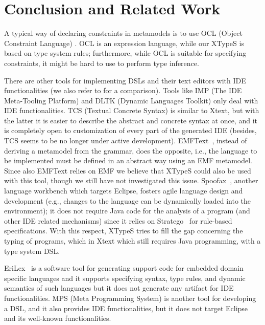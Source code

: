 \section{Conclusion and Related Work}
\label{sec:conclusion}

\newcommand{\xtypes}{XTypeS}
\newcommand{\xtext}{Xtext}

A typical way of declaring constraints in metamodels is to use OCL (Object
Constraint Language) \cite{WarmerKleppe99,OCLOMG}.  OCL is an expression
language, while our \xtypes{} is based on type system rules; furthermore, while
OCL is suitable for specifying constraints, it might be hard to use to perform
type inference.

There are other tools for implementing DSLs and their text editors with IDE
functionalities (we also refer to \cite{PP08} for a comparison). Tools like IMP
(The IDE Meta-Tooling Platform) \cite{imp09} and DLTK (Dynamic Languages
Toolkit) \cite{DLTK} only deal with IDE functionalities. TCS (Textual Concrete
Syntax) \cite{tcs} is similar to \xtext, but with the latter it is easier to
describe the abstract and concrete syntax at once, and it is completely open to
customization of every part of the generated IDE (besides, TCS seems to be no
longer under active development). EMFText~\cite{emftext09}, instead of deriving
a metamodel from the grammar, does the opposite, i.e., the language to be
implemented must be defined in an abstract way using an EMF metamodel. Since
also EMFText relies on EMF we believe that \xtypes{} could also be used with
this tool, though we still have not investigated this issue.
Spoofax~\cite{Spoofax2010}, another language workbench which targets Eclipse,
fosters agile language design and development (e.g., changes to the language can
be dynamically loaded into the environment); it does not require Java code for
the analysis of a program (and other IDE related mechanisms) since it relies on
Stratego~\cite{Stratego2008} for rule-based specifications.  With this respect,
\xtypes{} tries to fill the gap concerning the typing of programs, which in
\xtext{} which still requires Java programming, with a type system DSL.

EriLex~\cite{EriLex} is a software tool for generating support code for embedded
domain specific languages and it supports specifying syntax, type rules, and
dynamic semantics of such languages but it does not generate any artifact for
IDE functionalities. MPS (Meta Programming System) \cite{MPS} is another tool
for developing a DSL, and it also provides IDE functionalities, but it does not
target Eclipse and its well-known functionalities.

